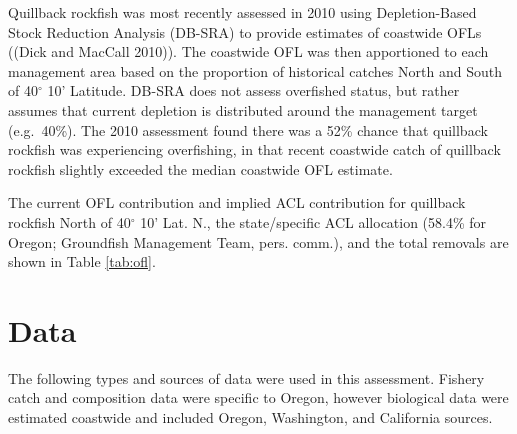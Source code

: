 \documentclass[11pt,
  english,
  a4paper,
]{article}
\begin{document}
\leavevmode\tagmcend\tagstructend\par


Quillback rockfish was most recently assessed in 2010 using Depletion-Based Stock Reduction Analysis (DB-SRA) to provide estimates of coastwide OFLs ({(Dick and MacCall 2010)\leavevmode\tagmcend\tagstructend}). The coastwide OFL was then apportioned to each management area based on the proportion of historical catches North and South of 40{\(^\circ\)\leavevmode\tagmcend\tagstructend} 10' Latitude. DB-SRA does not assess overfished status, but rather assumes that current depletion is distributed around the management target (e.g.~40\%). The 2010 assessment found there was a 52\% chance that quillback rockfish was experiencing overfishing, in that recent coastwide catch of quillback rockfish slightly exceeded the median coastwide OFL estimate.

\leavevmode\tagmcend\tagstructend\par


The current OFL contribution and implied ACL contribution for quillback rockfish North of 40{\(^\circ\)\leavevmode\tagmcend\tagstructend} 10' Lat. N., the state/specific ACL allocation (58.4\% for Oregon; Groundfish Management Team, pers. comm.), and the total removals are shown in Table \ref{tab:ofl}.

\leavevmode\tagmcend\tagstructend\par


\hypertarget{data}{%
\section{Data}\label{data}}

\leavevmode\tagmcend\tagstructend


The following types and sources of data were used in this assessment. Fishery catch and composition data were specific to Oregon, however biological data were estimated coastwide and included Oregon, Washington, and California sources.

\leavevmode\tagmcend\tagstructend\par
\end{document}
